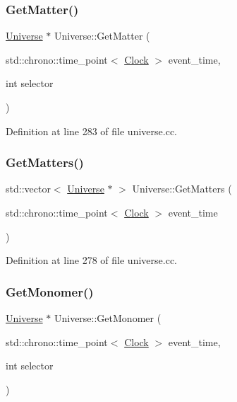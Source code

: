 \mbox{\label{class_universe_a69de663cf2e32e65ed28c44ae666db3a}} 
\subsubsection{\texorpdfstring{Get\+Matter()}{GetMatter()}}
{\footnotesize\ttfamily \mbox{\hyperlink{class_universe}{Universe}} $\ast$ Universe\+::\+Get\+Matter (\begin{DoxyParamCaption}\item[{std\+::chrono\+::time\+\_\+point$<$ \mbox{\hyperlink{universe_8h_a0ef8d951d1ca5ab3cfaf7ab4c7a6fd80}{Clock}} $>$}]{event\+\_\+time,  }\item[{int}]{selector }\end{DoxyParamCaption})}



Definition at line 283 of file universe.\+cc.

\mbox{\label{class_universe_a4307a62e183fed8cf2b92be0f6014688}} 
\subsubsection{\texorpdfstring{Get\+Matters()}{GetMatters()}}
{\footnotesize\ttfamily std\+::vector$<$ \mbox{\hyperlink{class_universe}{Universe}} $\ast$ $>$ Universe\+::\+Get\+Matters (\begin{DoxyParamCaption}\item[{std\+::chrono\+::time\+\_\+point$<$ \mbox{\hyperlink{universe_8h_a0ef8d951d1ca5ab3cfaf7ab4c7a6fd80}{Clock}} $>$}]{event\+\_\+time }\end{DoxyParamCaption})}



Definition at line 278 of file universe.\+cc.

\mbox{\label{class_universe_aaa03fb8178d790afd992dd094bb64b47}} 
\subsubsection{\texorpdfstring{Get\+Monomer()}{GetMonomer()}}
{\footnotesize\ttfamily \mbox{\hyperlink{class_universe}{Universe}} $\ast$ Universe\+::\+Get\+Monomer (\begin{DoxyParamCaption}\item[{std\+::chrono\+::time\+\_\+point$<$ \mbox{\hyperlink{universe_8h_a0ef8d951d1ca5ab3cfaf7ab4c7a6fd80}{Clock}} $>$}]{event\+\_\+time,  }\item[{int}]{selector }\end{DoxyParamCaption})}



